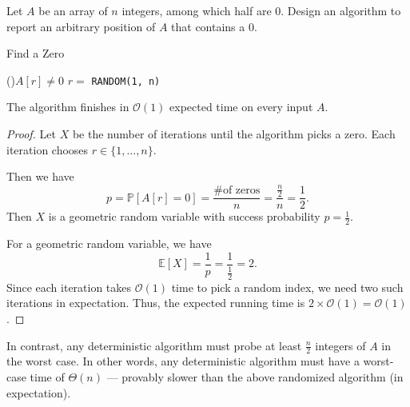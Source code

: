 \begin{eg}
  Let \(A\) be an array of \(n\) integers, among which half are 0. Design an algorithm to report an arbitrary position of \(A\) that contains a 0. 

  \begin{algorithm}[H]
	\DontPrintSemicolon{}
	\caption{Find a Zero}
	\BlankLine
	\While(){\(A[r] \neq 0\)}{
		\(r = \) \texttt{RANDOM(1, n)}
	}
	\;
  \end{algorithm}

  The algorithm finishes in \(\mathcal{O}(1)\) expected time on every input \(A\). 

  \begin{proof}
    Let \(X\) be the number of iterations until the algorithm picks a zero. Each iteration chooses \(r \in \{1,\dots, n\}\). 

    Then we have 
    \[
      p = \mathbb{P}\left[A[r] = 0\right] = \dfrac{\text{\# of zeros}}{n} = \dfrac{\frac{n}{2}}{n} = \dfrac{1}{2}.
    \]
    Then \(X\) is a geometric random variable with success probability \(p = \frac{1}{2}\). 

    For a geometric random variable, we have
    \[
      \mathbb{E}[X] = \dfrac{1}{p} = \dfrac{1}{\frac{1}{2}} = 2.
    \]
    Since each iteration takes \(\mathcal{O}(1)\) time to pick a random index, we need two such iterations in expectation. Thus, the expected running time is \(2 \times \mathcal{O}(1) = \mathcal{O}(1)\). 
  \end{proof}

  \begin{remark}
    In contrast, any deterministic algorithm must probe at least \(\frac{n}{2}\) integers of \(A\) in the worst case. In other words, any deterministic algorithm must have a worst-case time of \(\Theta(n)\) — provably slower than the above randomized algorithm (in expectation).
  \end{remark}
\end{eg}
